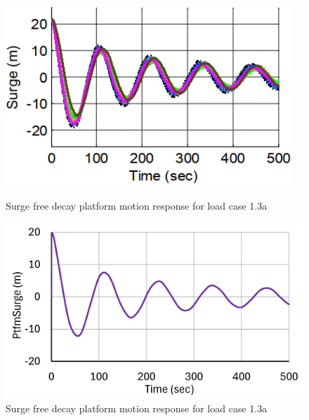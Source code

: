 \documentclass[a4paper, 11pt]{article}
\begin{document}
\begin{figure}[H]
    \begin{minipage}{0.48\textwidth}
        \centering
        \includegraphics[width=0.97\textwidth]{1.3a_surge.png}
        \caption{\small Surge free decay platform motion response for load case 1.3a \cite{Robertson2014}}
        \label{fig:1.3a_surge}
    \end{minipage}
    \hfill
    \begin{minipage}{0.49\textwidth}
        \centering
        \includegraphics[width=1\textwidth]{1.3a_surge_mine.png}
        \caption{\small Surge free decay platform motion response for load case 1.3a}
        \label{fig:1.3a_surge_mine}
    \end{minipage}
\end{figure}
\end{document}
